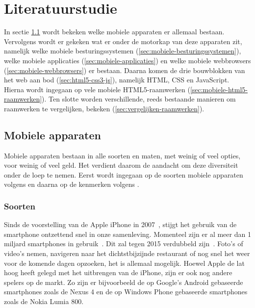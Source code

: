 \chapter{Literatuurstudie}
\label{chap:literatuurstudie}
In sectie \ref{sec:mobiele-apparaten} wordt bekeken welke mobiele apparaten er allemaal bestaan. 
Vervolgens wordt er gekeken wat er onder de motorkap van deze apparaten zit, namelijk welke mobiele besturingssystemen (\ref{sec:mobiele-besturingssystemen}), welke mobiele applicaties (\ref{sec:mobiele-applicaties}) en welke mobiele webbrowsers (\ref{sec:mobiele-webbrowsers}) er bestaan. 
Daarna komen de drie bouwblokken van het web aan bod (\ref{sec:html5-css3-js}), namelijk HTML, CSS en JavaScript.
Hierna wordt ingegaan op vele mobiele HTML5-raamwerken (\ref{sec:mobiele-html5-raamwerken}).  
Ten slotte worden verschillende, reeds bestaande manieren om raamwerken te vergelijken, bekeken (\ref{sec:vergelijken-raamwerken}).


\section{Mobiele apparaten}
\label{sec:mobiele-apparaten}
Mobiele apparaten bestaan in alle soorten en maten, met weinig of veel opties, voor weinig of veel geld. 
Het verdient daarom de aandacht om deze diversiteit onder de loep te nemen. 
Eerst wordt ingegaan op de soorten mobiele apparaten volgens \cite{GCF2013} en daarna op de kenmerken volgens \cite{PhilDutson2012}.

\subsection{Soorten}
Sinds de voorstelling van de Apple iPhone in 2007~\cite{David2011}, stijgt het gebruik van de smartphone ontzettend snel in onze samenleving.  
Momenteel zijn er al meer dan 1 miljard smartphones in gebruik~\cite{Yang2012}. 
Dit zal tegen 2015 verdubbeld zijn~\cite{Gillett2012}.
Foto's of video's nemen, navigeren naar het dichtstbijzijnde restaurant of nog snel het weer voor de komende dagen opzoeken, het is allemaal mogelijk. 
Hoewel Apple de lat hoog heeft gelegd met het uitbrengen van de iPhone, zijn er ook nog andere spelers op de markt. 
Zo zijn er bijvoorbeeld de op Google's Android gebaseerde smartphones zoals de Nexus 4 en de op Windows Phone gebaseerde smartphones zoals de Nokia Lumia 800.

